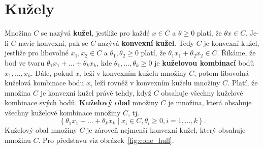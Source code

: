 \section{Kužely}

Množina $C$ se nazývá \textbf{kužel}, jestliže pro každé $x \in C$ a $\theta \geq 0$ platí, že $\theta x \in C$. Je-li $C$ navíc konvexní, pak se $C$ nazývá \textbf{konvexní kužel}. Tedy $C$ je konvexní kužel, jestliže pro libovolné $x_1, x_2 \in C$ a $\theta_1, \theta_2 \geq 0$ platí, že $\theta_1 x_1 + \theta_2 x_2 \in C$. Říkáme, že bod ve tvaru $\theta_1 x_1 + \dots + \theta_k x_k$, kde $\theta_1, \dots, \theta_k \geq 0$ je \textbf{kuželovou kombinací} bodů $x_1, \dots, x_k$. Dále, pokud $x_i$ leží v konvexním kuželu množiny $C$, potom libovolná kuželová kombinace bodu $x_i$ leží rovněž v konvexním kuželu množiny $C$. Platí, že množina $C$ je konvexní kužel právě tehdy, když $C$ obsahuje všechny kuželové kombinace svých bodů. \textbf{Kuželový obal} množiny $C$ je množina, která obsahuje všechny kuželové kombinace množiny $C$, tj.
$$
    \left\{ \theta_1 x_1 + \dots + \theta_k x_k \mid x_i \in C, \theta_i \geq 0, i = 1, \dots, k \right\}.
$$
Kuželový obal množiny $C$ je zároveň nejmenší konvexní kužel, který obsahuje množinu $C$. Pro představu viz obrázek~\ref{fig:cone_hull}.

